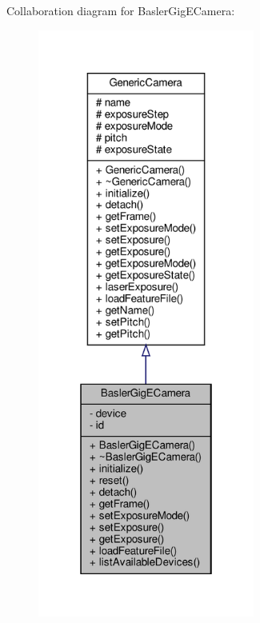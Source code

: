 Collaboration diagram for Basler\+Gig\+E\+Camera\+:
\nopagebreak
\begin{figure}[H]
\begin{center}
\leavevmode
\includegraphics[height=550pt]{class_basler_gig_e_camera__coll__graph}
\end{center}
\end{figure}
